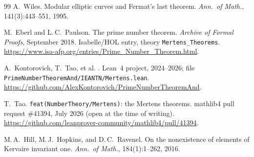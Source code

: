 \begin{thebibliography}{99}
A.~Wiles.
\newblock Modular elliptic curves and {F}ermat's last theorem.
\newblock \emph{Ann.\ of Math.}, 141(3):443--551, 1995.

M.~Eberl and L.\,C.~Paulson.
\newblock The prime number theorem.
\newblock \emph{Archive of Formal Proofs}, September 2018.
\newblock Isabelle/HOL entry, theory \texttt{Mertens\_Theorems}.
\newblock \url{https://www.isa-afp.org/entries/Prime_Number_Theorem.html}.

A.~Kontorovich, T.~Tao, et al.
.
\newblock Lean~4 project, 2024--2026; file
  \texttt{PrimeNumberTheoremAnd/IEANTN/Mertens.lean}.
\newblock \url{https://github.com/AlexKontorovich/PrimeNumberTheoremAnd}.

T.~Tao.
\newblock \texttt{feat(NumberTheory/Mertens)}: the {M}ertens theorems.
\newblock mathlib4 pull request \#41394, July 2026 (open at the time of writing).
\newblock \url{https://github.com/leanprover-community/mathlib4/pull/41394}.

M.\,A.~Hill, M.\,J.~Hopkins, and D.\,C.~Ravenel.
\newblock On the nonexistence of elements of {K}ervaire invariant one.
\newblock \emph{Ann.\ of Math.}, 184(1):1--262, 2016.

\end{thebibliography}

